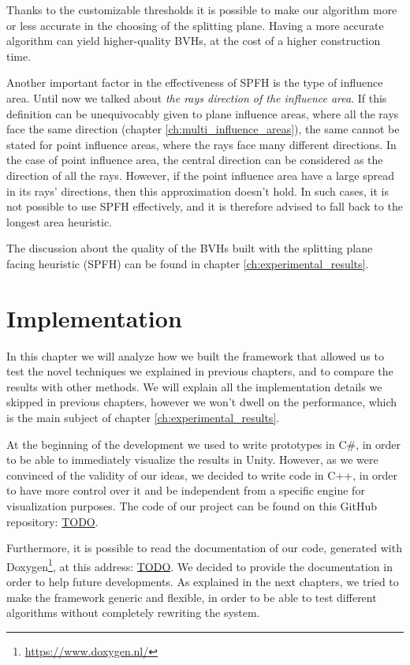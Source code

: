 \documentclass{PoliMi_MasterThesis}
\begin{document}
Thanks to the customizable thresholds it is possible to make our algorithm more or less accurate in the choosing of the splitting plane. Having a more accurate algorithm can yield higher-quality BVHs, at the cost of a higher construction time.

Another important factor in the effectiveness of SPFH is the type of influence area. Until now we talked about \textit{the rays direction of the influence area}. If this definition can be unequivocably given to plane influence areas, where all the rays face the same direction (chapter \ref{ch:multi_influence_areas}), the same cannot be stated for point influence areas, where the rays face many different directions. In the case of point influence area, the central direction can be considered as the direction of all the rays. However, if the point influence area have a large spread in its rays' directions, then this approximation doesn't hold. In such cases, it is not possible to use SPFH effectively, and it is therefore advised to fall back to the longest area heuristic.
	
The discussion about the quality of the BVHs built with the splitting plane facing heuristic (SPFH) can be found in chapter \ref{ch:experimental_results}.

\chapter{Implementation} \label{ch:implementation}
In this chapter we will analyze how we built the framework that allowed us to test the novel techniques we explained in previous chapters, and to compare the results with other methods.
We will explain all the implementation details we skipped in previous chapters, however we won't dwell on the performance, which is the main subject of chapter \ref{ch:experimental_results}.

At the beginning of the development we used to write prototypes in C\#, in order to be able to immediately visualize the results in Unity. However, as we were convinced of the validity of our ideas, we decided to write code in C++, in order to have more control over it and be independent from a specific engine for visualization purposes. The code of our project can be found on this GitHub repository: \url{TODO}.

Furthermore, it is possible to read the documentation of our code, generated with Doxygen\footnote{\url{https://www.doxygen.nl/}}, at this address: \url{TODO}. We decided to provide the documentation in order to help future developments. As explained in the next chapters, we tried to make the framework generic and flexible, in order to be able to test different algorithms without completely rewriting the system.
\end{document}
